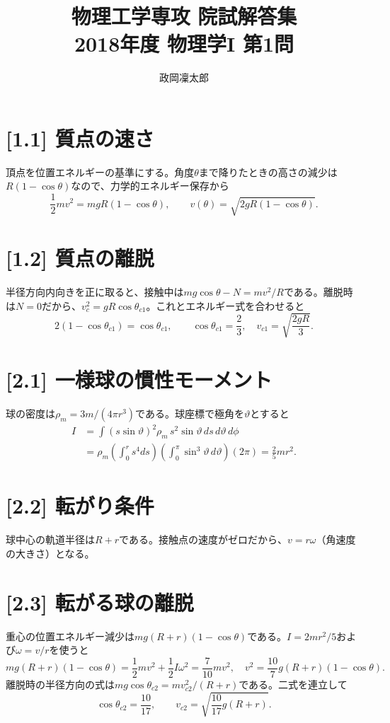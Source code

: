 \documentclass[11pt,a4paper]{article}
\title{物理工学専攻 院試解答集\\2018年度 物理学I 第1問}
\author{政岡凜太郎}
\date{}
\begin{document}
\maketitle

\section*{[1.1] 質点の速さ}
頂点を位置エネルギーの基準にする。角度$\theta$まで降りたときの高さの減少は$R(1-\cos\theta)$なので、力学的エネルギー保存から
\begin{equation}
 \frac12 mv^2=mgR(1-\cos\theta),\qquad
 \boxed{v(\theta)=\sqrt{2gR(1-\cos\theta)}}.
\end{equation}

\section*{[1.2] 質点の離脱}
半径方向内向きを正に取ると、接触中は$mg\cos\theta-N=mv^2/R$である。離脱時は$N=0$だから、$v_c^2=gR\cos\theta_{c1}$。これとエネルギー式を合わせると
\begin{equation}
 2(1-\cos\theta_{c1})=\cos\theta_{c1},\qquad
 \boxed{\cos\theta_{c1}=\frac23},\quad
 \boxed{v_{c1}=\sqrt{\frac{2gR}{3}}}.
\end{equation}

\section*{[2.1] 一様球の慣性モーメント}
球の密度は$\rho_m=3m/(4\pi r^3)$である。球座標で極角を$\vartheta$とすると
\begin{align}
 I&=\int (s\sin\vartheta)^2\rho_m\,s^2\sin\vartheta\,ds\,d\vartheta\,d\phi\\
 &=\rho_m\left(\int_0^r s^4ds\right)
   \left(\int_0^\pi\sin^3\vartheta\,d\vartheta\right)(2\pi)
 =\boxed{\frac25mr^2}.
\end{align}

\section*{[2.2] 転がり条件}
球中心の軌道半径は$R+r$である。接触点の速度がゼロだから、$v=r\omega$（角速度の大きさ）となる。

\section*{[2.3] 転がる球の離脱}
重心の位置エネルギー減少は$mg(R+r)(1-\cos\theta)$である。$I=2mr^2/5$および$\omega=v/r$を使うと
\begin{equation}
 mg(R+r)(1-\cos\theta)=\frac12mv^2+\frac12I\omega^2
 =\frac7{10}mv^2,
\quad v^2=\frac{10}{7}g(R+r)(1-\cos\theta).
\end{equation}
離脱時の半径方向の式は$mg\cos\theta_{c2}=mv_{c2}^2/(R+r)$である。二式を連立して
\begin{equation}
 \boxed{\cos\theta_{c2}=\frac{10}{17}},\qquad
 \boxed{v_{c2}=\sqrt{\frac{10}{17}g(R+r)}}.
\end{equation}
\end{document}

